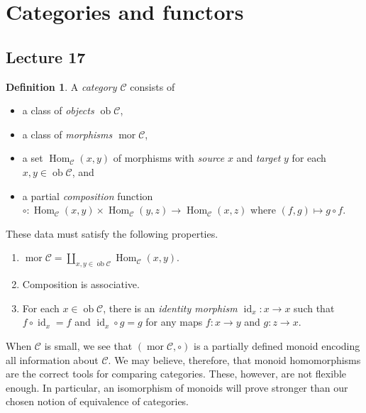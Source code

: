 \documentclass[10pt,letterpaper,cm]{nupset}
\theoremstyle{definition}
\newtheorem{definition}{Definition}[subsection]
\theoremstyle{theorem}
\theoremstyle{remark}
\newcommand{\1}{\mathbf{1}}
\renewcommand{\c}{\mathscr{C}}
\newcommand{\0}{\vec 0}
\DeclareMathOperator{\id}{\mathrm{id}}
\DeclareMathOperator{\mor}{mor}
\DeclareMathOperator{\ob}{ob}
\DeclareMathOperator{\Hom}{Hom}
\begin{document}
\section{Categories and functors}

\subsection{Lecture 17}

\begin{definition} 
A \textit{category $\c$} consists of
\begin{itemize}
\item a class of \textit{objects $\ob{\c}$},
\item a class of \textit{morphisms $\mor{\c}$},
\item a set $\Hom_{\c}(x,y)$ of morphisms with \textit{source} $x$ and \textit{target} $y$ for each $x,y \in \ob{\c}$, and
\item a partial  \textit{composition} function $\circ : \Hom_{\c}(x,y) \times \Hom_{\c}(y,z) \to \Hom_{\c}(x,z)$ where $\left(f,g\right) \mapsto g \circ f$.
\end{itemize}
These data must satisfy the following properties.
\begin{enumerate}[label=(\roman*)]
\item $\mor{\c} = \coprod_{x,y\in \ob{\c}} \Hom_{\c}(x,y)$.
\item Composition is associative.
\item For each $x\in \ob{\c}$, there is an \textit{identity morphism $\id_x: x \to x$} such that $f \circ \id_x = f$ and $\id_x \circ g = g$ for any maps $f: x \to y$ and $g: z \to x$.
\end{enumerate}
\end{definition}

\smallskip

When $\c$ is small, we see that $\left(\mor{\c}, \circ\right)$ is a partially defined monoid encoding all information about $\c$. We may believe, therefore, that monoid homomorphisms are the correct tools for comparing categories. These, however, are not flexible enough. In particular, an isomorphism of monoids will prove stronger than our chosen notion of equivalence of categories.

\smallskip
\end{document}
